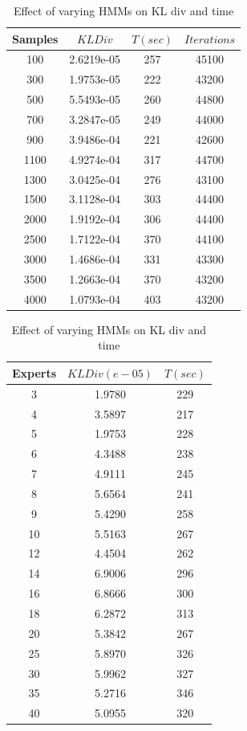 \documentclass{sig-alternate}
\begin{document}
\begin{table}[htdp]
\parbox{.51\linewidth}{
\centering
\begin{tabular}{| c | c | c | c |}
\hline
Samples & $KL Div$ & $T(sec)$ & $Iterations$ \\
\hline
100 & 2.6219e-05 & 257 & 45100 \\
300 & 1.9753e-05 & 222 & 43200 \\
500 & 5.5493e-05 & 260 & 44800 \\
700 & 3.2847e-05 & 249 & 44000 \\
900 & 3.9486e-04 & 221 & 42600 \\
1100 & 4.9274e-04 & 317 & 44700 \\
1300 & 3.0425e-04 & 276 & 43100 \\
1500 &  3.1128e-04 & 303 & 44400\\
2000 & 1.9192e-04 & 306 & 44400\\
2500 & 1.7122e-04 & 370 & 44100 \\
3000 & 1.4686e-04 & 331 & 43300 \\
3500 & 1.2663e-04 & 370 & 43200 \\
4000 & 1.0793e-04 & 403 & 43200 \\
\hline
\end{tabular}
\caption{Effect of varying samples on KL div}
\label{table:sample2}
}
\hfill
\parbox{.51\linewidth}{
\centering
\begin{tabular}{| c | c | c |}
\hline
Experts & $KL Div (e-05)$ & $T(sec)$\\
\hline
3 & 1.9780 & 229 \\
4 & 3.5897 & 217 \\
5 & 1.9753 & 228 \\
6 & 4.3488 & 238 \\
7 & 4.9111 & 245  \\
8 & 5.6564 & 241 \\
9 & 5.4290 & 258 \\
10 & 5.5163 & 267 \\
12 & 4.4504 & 262 \\
14 & 6.9006 & 296 \\
16 & 6.8666 & 300 \\
18 & 6.2872 & 313 \\
20 & 5.3842 & 267 \\
25 & 5.8970 & 326 \\
30 & 5.9962 & 327  \\
35 & 5.2716 & 346 \\
40 & 5.0955 & 320 \\
\hline
\end{tabular}
\caption{Effect of varying HMMs on KL div and time}
\label{table:expert2}
}
\end{table}
\end{document}
